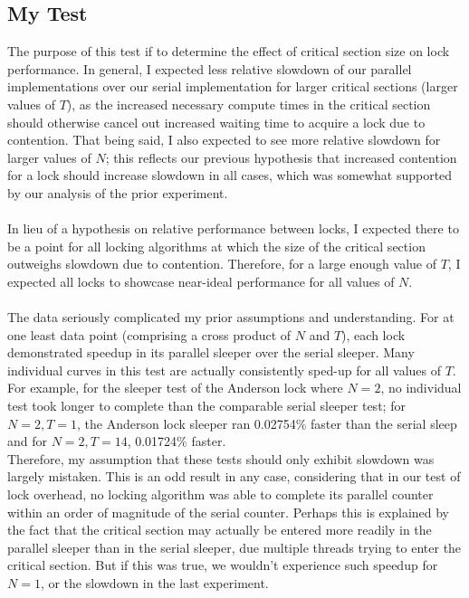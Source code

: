 \documentclass[]{article}
\begin{document}
\subsection{My Test}
The purpose of this test if to determine the effect of critical section size on lock performance. In general, I expected less relative slowdown of our parallel implementations over our serial implementation for larger critical sections (larger values of $T$), as the increased necessary compute times in the critical section should otherwise cancel out increased waiting time to acquire a lock due to contention. That being said, I also expected to see more relative slowdown for larger values of $N$; this reflects our previous hypothesis that increased contention for a lock should increase slowdown in all cases, which was somewhat supported by our analysis of the prior experiment.
\\\\
In lieu of a hypothesis on relative performance between locks, I expected there to be a point for all locking algorithms at which the size of the critical section outweighs slowdown due to contention. Therefore, for a large enough value of $T$, I expected all locks to showcase near-ideal performance for all values of $N$.
\\\\
The data seriously complicated my prior assumptions and understanding. For at one least data point (comprising a cross product of $N$ and $T$), each lock demonstrated speedup in its parallel sleeper over the serial sleeper. Many individual curves in this test are actually consistently sped-up for all values of $T$. For example, for the sleeper test of the Anderson lock where $N = 2$, no individual test took longer to complete than the comparable serial sleeper test; for $N = 2, T =1$, the Anderson lock sleeper ran 0.02754\% faster than the serial sleep and for $N =2, T = 14$, 0.01724\% faster.
\\
Therefore, my assumption that these tests should only exhibit slowdown was largely mistaken. This is an odd result in any case, considering that in our test of lock overhead, no locking algorithm was able to complete its parallel counter within an order of magnitude of the serial counter. Perhaps this is explained by the fact that the critical section may actually be entered more readily in the parallel sleeper than in the serial sleeper, due multiple threads trying to enter the critical section. But if this was true, we wouldn't experience such speedup for $N = 1$, or the slowdown in the last experiment.
\end{document}
